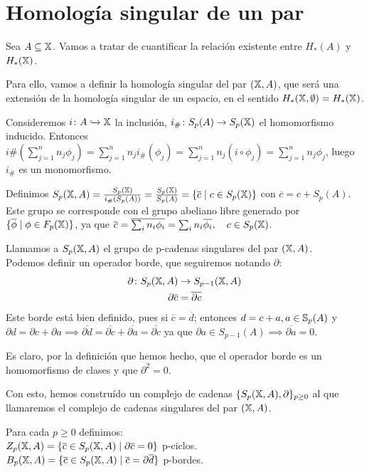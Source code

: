 \section{Homología singular de un par}

Sea $A \subseteq \X$. Vamos a tratar de cuantificar la relación existente entre $H_*(A)$ y $H_*(\X)$.

Para ello, vamos a definir la homología singular del par $(\X, A)$, que será una extensión de la homología singular de un espacio, en el sentido
$H_*(\X, \emptyset) = H_*(\X)$.

Consideremos $i \colon A \xhookrightarrow{} \X$ la inclusión, $i_\# \colon S_p(A) \to \SX{p}$ el homomorfismo inducido.
Entonces $i\#(\sum\limits_{j = 1}^n n_j \phi_j) = \sum\limits_{j = 1}^n n_j i_\#(\phi_j) = \sum\limits_{j = 1}^n n_j (i \circ \phi_j) = \sum\limits_{j = 1}^n n_j \phi_j$,
luego $i_\#$ es un monomorfismo.

Definimos $S_p(\X, A) = \frac{\SX{p}}{i_\#(S_p(A))} = \frac{\SX{p}}{S_p(A)} = \{\overline{c} \mid c \in \SX{p} \}$ con $\overline{c} = c + S_p(A)$.
Este grupo se corresponde con el grupo abeliano libre generado por $\{\overline{\phi} \mid \phi \in \FX{p}\}$, ya que
$ \overline{c} = \overline{\sum_i n_i \phi_i} = \sum_i n_i \overline{\phi_i}, \quad c \in \SX{p}$.

Llamamos a $S_p(\X, A)$ el grupo de p-cadenas singulares del par $(\X, A)$. \\
Podemos definir un operador borde, que seguiremos notando $\partial$:
\begin{align*}
  \partial \colon S_p(\X, A) &\to S_{p-1}(\X, A) \\
  \partial \overline{c} &= \overline{\partial c}
\end{align*}
Este borde está bien definido, pues si $\overline{c} = \overline{d}$; entonces $d = c + a, a \in \S_p(A)$ y
$\partial d = \partial c + \partial a \implies \overline{\partial d} = \overline{\partial c} + \overline{\partial a} = \overline{\partial c}$ ya que
$\partial a \in S_{p-1}(A) \implies \overline{\partial a} = 0$.

Es claro, por la definición que hemos hecho, que el operador borde es un homomorfismo de clases y que $\partial^2 = 0$.

Con esto, hemos construído un complejo de cadenas $\{S_p(\X, A), \partial\}_{p \geq 0}$ al que llamaremos el complejo de cadenas singulares del par $(\X, A)$.

Para cada $p \geq 0$ definimos: \\
$Z_p(\X, A) = \{\overline{c} \in S_p(\X, A) \mid \partial\overline{c} = 0\}$ p-ciclos. \\
$B_p(\X, A) = \{\overline{c} \in S_p(\X, A) \mid \overline{c} = \partial\overline{d} \}$ p-bordes.


